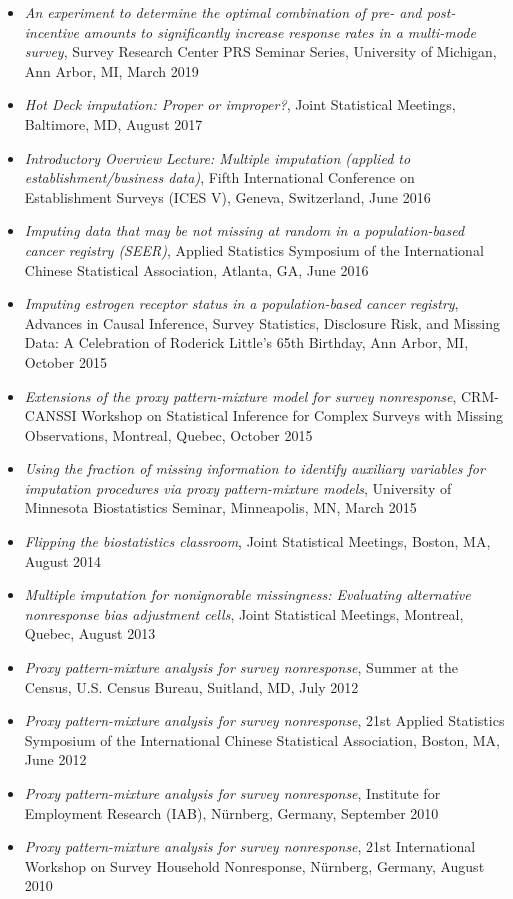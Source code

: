 \documentclass[
  english,
  letterpaper,
  DIV=11,
  numbers=noendperiod]{scrartcl}
\begin{document}
\begin{itemize}
\item
  \emph{An experiment to determine the optimal combination of pre- and
  post-incentive amounts to significantly increase response rates in a
  multi-mode survey}, Survey Research Center PRS Seminar Series,
  University of Michigan, Ann Arbor, MI, March 2019
\item
  \emph{Hot Deck imputation: Proper or improper?}, Joint Statistical
  Meetings, Baltimore, MD, August 2017
\item
  \emph{Introductory Overview Lecture: Multiple imputation (applied to
  establishment/business data)}, Fifth International Conference on
  Establishment Surveys (ICES V), Geneva, Switzerland, June 2016
\item
  \emph{Imputing data that may be not missing at random in a
  population-based cancer registry (SEER)}, Applied Statistics Symposium
  of the International Chinese Statistical Association, Atlanta, GA,
  June 2016
\item
  \emph{Imputing estrogen receptor status in a population-based cancer
  registry}, Advances in Causal Inference, Survey Statistics, Disclosure
  Risk, and Missing Data: A Celebration of Roderick Little's 65th
  Birthday, Ann Arbor, MI, October 2015
\item
  \emph{Extensions of the proxy pattern-mixture model for survey
  nonresponse}, CRM-CANSSI Workshop on Statistical Inference for Complex
  Surveys with Missing Observations, Montreal, Quebec, October 2015
\item
  \emph{Using the fraction of missing information to identify auxiliary
  variables for imputation procedures via proxy pattern-mixture models},
  University of Minnesota Biostatistics Seminar, Minneapolis, MN, March
  2015
\item
  \emph{Flipping the biostatistics classroom}, Joint Statistical
  Meetings, Boston, MA, August 2014
\item
  \emph{Multiple imputation for nonignorable missingness: Evaluating
  alternative nonresponse bias adjustment cells}, Joint Statistical
  Meetings, Montreal, Quebec, August 2013
\item
  \emph{Proxy pattern-mixture analysis for survey nonresponse}, Summer
  at the Census, U.S. Census Bureau, Suitland, MD, July 2012
\item
  \emph{Proxy pattern-mixture analysis for survey nonresponse}, 21st
  Applied Statistics Symposium of the International Chinese Statistical
  Association, Boston, MA, June 2012
\item
  \emph{Proxy pattern-mixture analysis for survey nonresponse},
  Institute for Employment Research (IAB), Nürnberg, Germany, September
  2010
\item
  \emph{Proxy pattern-mixture analysis for survey nonresponse}, 21st
  International Workshop on Survey Household Nonresponse, Nürnberg,
  Germany, August 2010
\end{itemize}
\end{document}
